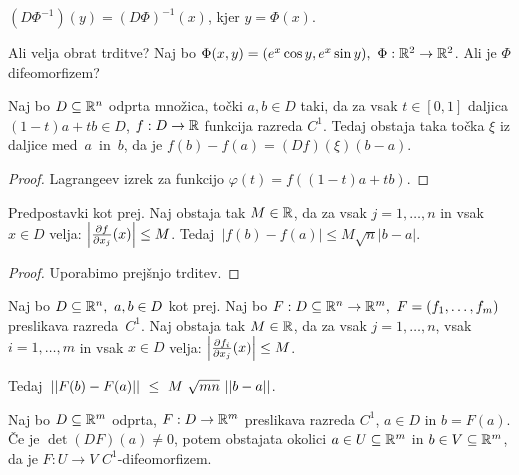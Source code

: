 \begin{posledica}
    $(D\Phi^{-1})(y) = (D\Phi)^{-1}(x)$, kjer $y = \Phi(x)$.
\end{posledica}

\begin{zgled}
    Ali velja obrat trditve? 
    Naj bo $\Phi(x,y) = (e^x \cos y, e^x \sin y), \ \Phi: \mathbb{R}^2 \to \mathbb{R}^2$. Ali je $\Phi$ difeomorfizem?
\end{zgled}

\begin{lema}
    Naj bo $D \subseteq \mathbb{R}^n$ odprta množica, točki $a, b \in D$ taki, da za vsak $t \in [0,1]$ daljica $(1-t)a + tb \in D$, $f: D \to \mathbb{R}$ funkcija razreda $C^1$.     
    Tedaj obstaja taka točka $\xi$ iz daljice med~$a$~in~$b$, da je $f(b)-f(a) = (Df)(\xi)(b-a)$.
\end{lema}

\begin{proof}
    Lagrangeev izrek za funkcijo $\varphi(t) = f((1-t)a + tb)$.
\end{proof}

\begin{lema}
    Predpostavki kot prej. Naj obstaja tak $M \in \mathbb{R}$, da za vsak $j = 1, \ldots, n$ in vsak $x \in D$ velja: $\left|\frac{\partial f}{\partial x_j}(x)\right| \leq M$. Tedaj~$|f(b)-f(a)| \leq M \sqrt{n}|b-a|$.
\end{lema}

\begin{proof}
    Uporabimo prejšnjo trditev.
\end{proof}

\begin{lema}
    Naj bo $D \subseteq \mathbb{R}^n, \ a,b \in D$ kot prej. Naj bo $F: D \subseteq \mathbb{R}^n \to \mathbb{R}^m, \ F = (f_1, \ldots, f_m)$ preslikava razreda~$C^1$. Naj obstaja tak $M \in \mathbb{R}$, da za vsak $j = 1, \ldots, n$, vsak $i = 1, \ldots, m$ in vsak $x \in D$ velja: $\left|\frac{\partial f_i}{\partial x_j}(x)\right| \leq M$. 
    
    Tedaj~$||F(b) - F(a)||~\leq~M~\sqrt{mn}~||b - a||$.
\end{lema}

\begin{izrek}
    Naj bo $D \subseteq \mathbb{R}^m$ odprta, $F: D \to \mathbb{R}^m$ preslikava razreda $C^1$,  $a \in D$ in $b = F(a)$.
    Če je $\det(DF)(a) \neq 0$, potem obstajata okolici $a \in U \subseteq \mathbb{R}^m$ in $b \in V \subseteq \mathbb{R}^m$, da je $F: U \to V$ $C^1$-difeomorfizem.    
\end{izrek}

